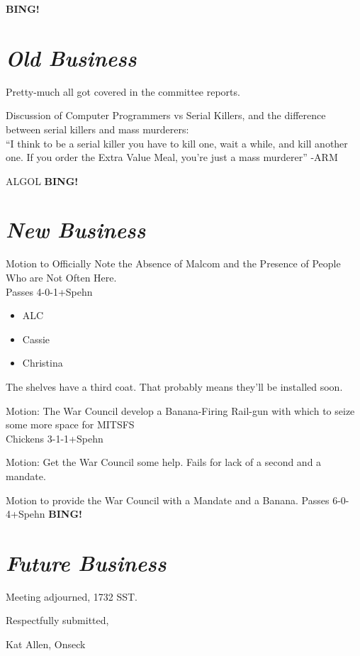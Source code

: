 \documentclass[10pt]{article}
\newcommand{\bing}{{\bf BING!} }
\newcommand{\goto}[1]{\bing \vskip 12pt \section*{{\em{#1}}}}
\begin{document}
\goto{Old Business}

Pretty-much all got covered in the committee reports.

Discussion of Computer Programmers vs Serial Killers, and the
difference between serial killers and mass murderers:\\
``I think to be a serial killer you have to kill one, wait a while,
and kill another one.  If you order the Extra Value Meal, you're just
a mass murderer'' -ARM

ALGOL
\goto{New Business}
Motion to Officially Note the Absence of Malcom and the Presence of
People Who are Not Often Here.\\
Passes 4-0-1+Spehn\\
\begin{itemize}
\item {ALC}
\item Cassie
\item Christina
\end{itemize}

The shelves have a third coat. That probably means they'll be
installed soon.


Motion: The War Council develop a Banana-Firing Rail-gun with which to
seize some more space for MITSFS\\
Chickens 3-1-1+Spehn

Motion: Get the War Council some help.
Fails for lack of a second and a mandate.

Motion to provide the War Council with a Mandate and a Banana. 
Passes 6-0-4+Spehn
\goto{Future Business}

\vspace{12pt}

\noindent
Meeting adjourned, 1732 SST.

\vspace{18pt}

\centerline{Respectfully submitted,}
\centerline{Kat Allen,  Onseck}
\end{document}
